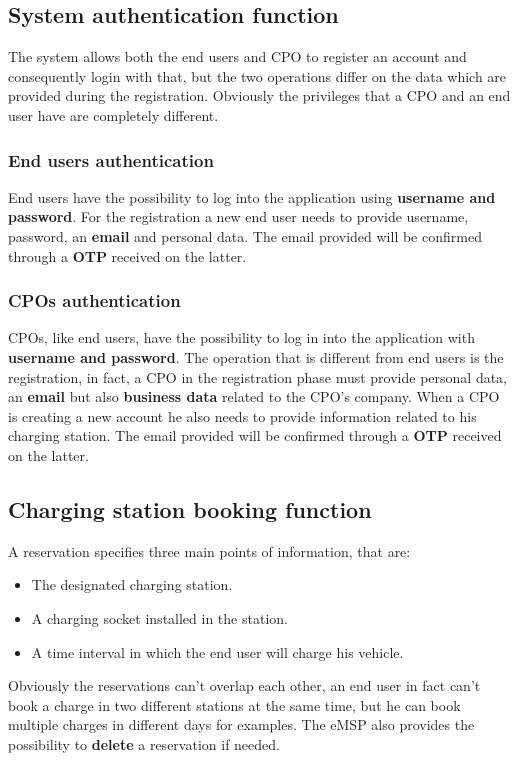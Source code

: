 \subsection{System authentication function}
The system allows both the end users and CPO to register an account and consequently login with that, but the two operations differ on the data which are provided during the registration. Obviously the privileges that a CPO and an end user have are completely different. 
\subsubsection{End users authentication}
End users have the possibility to log into the application using \textbf{username and password}. For the registration a new end user needs to provide username, password, an \textbf{email} and personal data. The email provided will be confirmed through a \textbf{OTP} received on the latter.
\subsubsection{CPOs authentication}
CPOs, like end users, have the possibility to log in into the application with \textbf{username and password}. The operation that is different from end users is the registration, in fact, a CPO in the registration phase must provide personal data, an  \textbf{email} but also \textbf{business data} related to the CPO's company. When a CPO is creating a new account he also needs to provide information related to his charging station. The email provided will be confirmed through a \textbf{OTP} received on the latter.
\subsection{Charging station booking function}
A reservation specifies three main points of information, that are:
\begin{itemize}
    \item The designated charging station.
    \item A charging socket installed in the station.
    \item A time interval in which the end user will charge his vehicle. 
\end{itemize}
Obviously the reservations can't overlap each other, an end user in fact can't book a charge in two different stations at the same time, but he can book multiple charges in different days for examples. The eMSP also provides the possibility to \textbf{delete} a reservation if needed.
